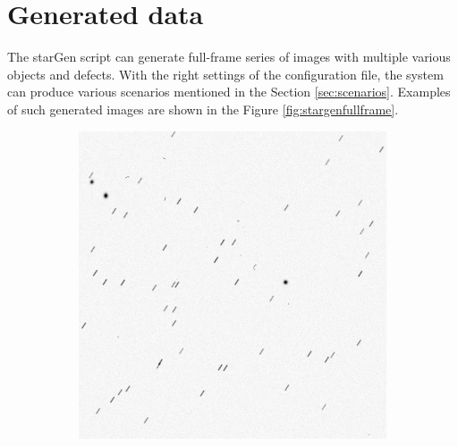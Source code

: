 \section{Generated data}

The starGen script can generate full-frame series of images with multiple various objects and defects. With the right settings of the configuration file, the system can produce various scenarios mentioned in the Section \ref{sec:scenarios}. Examples of such generated images are shown in the Figure \ref{fig:stargenfullframe}. 

\begin{figure}[!h]
\centering
    \begin{subfigure}[t]{.4\textwidth}
        \centering
        \includegraphics[width=\textwidth]{images/fullframestargen1.jpg}
    \end{subfigure}
    \begin{subfigure}[t]{.4\textwidth}
        \centering

\end{subfigure}
\end{figure}
